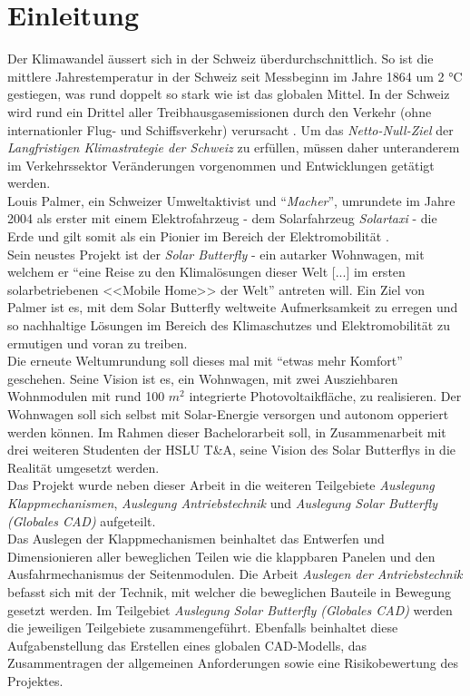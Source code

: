 \section{Einleitung}
Der Klimawandel äussert sich in der Schweiz überdurchschnittlich. So ist die mittlere Jahrestemperatur in der Schweiz seit Messbeginn im Jahre 1864 um 2 °C gestiegen, was rund doppelt so stark wie ist das globalen Mittel. In der Schweiz wird rund ein Drittel aller Treibhausgasemissionen durch den Verkehr (ohne internationler Flug- und Schiffsverkehr) verursacht \cite{BAFU}. Um das \emph{Netto-Null-Ziel} der \emph{Langfristigen Klimastrategie der Schweiz} zu erfüllen, müssen daher unteranderem im Verkehrssektor Veränderungen vorgenommen und Entwicklungen getätigt werden.\\
Louis Palmer, ein Schweizer Umweltaktivist und ``\emph{Macher}'', umrundete im Jahre 2004 als erster mit einem Elektrofahrzeug - dem Solarfahrzeug \emph{Solartaxi} - die Erde und gilt somit als ein Pionier im Bereich der Elektromobilität \cite{Palmer}.\\
Sein neustes Projekt ist der \emph{Solar Butterfly} - ein autarker Wohnwagen, mit welchem er ``eine Reise zu den Klimalösungen dieser Welt [...] im ersten solarbetriebenen <<Mobile Home>> der Welt'' antreten will. Ein Ziel von Palmer ist es, mit dem Solar Butterfly weltweite Aufmerksamkeit zu erregen und so nachhaltige Lösungen im Bereich des Klimaschutzes und Elektromobilität zu ermutigen und voran zu treiben.\\
Die erneute Weltumrundung soll dieses mal mit ``etwas mehr Komfort'' geschehen. Seine Vision ist es, ein Wohnwagen, mit zwei Ausziehbaren Wohnmodulen mit rund 100 $m^2$ integrierte Photovoltaikfläche, zu realisieren. Der Wohnwagen soll sich selbst mit Solar-Energie versorgen und autonom opperiert werden können. Im Rahmen dieser Bachelorarbeit soll, in Zusammenarbeit mit drei weiteren Studenten der HSLU T\&A, seine Vision des Solar Butterflys in die Realität umgesetzt werden.\\
Das Projekt wurde neben dieser Arbeit in die weiteren Teilgebiete \emph{Auslegung Klappmechanismen}, \emph{Auslegung Antriebstechnik} und \emph{Auslegung Solar Butterfly (Globales CAD)} aufgeteilt.\\
Das Auslegen der Klappmechanismen beinhaltet das Entwerfen und Dimensionieren aller beweglichen Teilen wie die klappbaren Panelen und den Ausfahrmechanismus der Seitenmodulen. Die Arbeit \emph{Auslegen der Antriebstechnik} befasst sich mit der Technik, mit welcher die beweglichen Bauteile in Bewegung gesetzt werden. Im Teilgebiet \emph{Auslegung Solar Butterfly (Globales CAD)} werden die jeweiligen Teilgebiete zusammengeführt. Ebenfalls beinhaltet diese Aufgabenstellung das Erstellen eines globalen CAD-Modells, das Zusammentragen der allgemeinen Anforderungen sowie eine Risikobewertung des Projektes.\\

